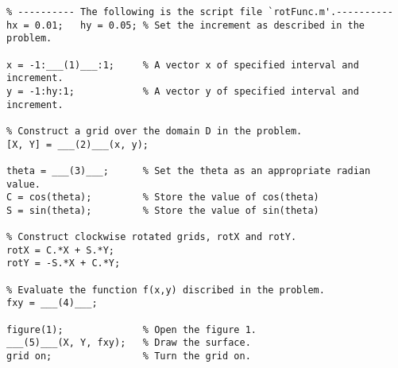 \documentclass[11pt,a4paper]{article}
\begin{document}
\begin{enumerate}
\begin{enumerate}
    \vspace{2mm}

    \begin{verbatim}
% ---------- The following is the script file `rotFunc.m'.----------
hx = 0.01;   hy = 0.05; % Set the increment as described in the problem.

x = -1:___(1)___:1;     % A vector x of specified interval and increment.
y = -1:hy:1;            % A vector y of specified interval and increment.

% Construct a grid over the domain D in the problem.
[X, Y] = ___(2)___(x, y);

theta = ___(3)___;      % Set the theta as an appropriate radian value.
C = cos(theta);         % Store the value of cos(theta)
S = sin(theta);         % Store the value of sin(theta)

% Construct clockwise rotated grids, rotX and rotY.
rotX = C.*X + S.*Y;
rotY = -S.*X + C.*Y;

% Evaluate the function f(x,y) discribed in the problem.
fxy = ___(4)___;

figure(1);              % Open the figure 1.
___(5)___(X, Y, fxy);   % Draw the surface.
grid on;                % Turn the grid on.
    \end{verbatim}
\end{enumerate}

\end{enumerate}

\newpage
\end{document}
